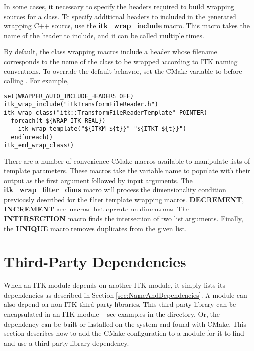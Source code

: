 In some cases, it necessary to specify the headers required to build wrapping
sources for a class. To specify additional headers to included in the generated
wrapping C++ source, use the \textbf{itk\_wrap\_include} macro. This macro takes the
name of the header to include, and it can be called multiple times.

By default, the class wrapping macros include a header whose filename
corresponds to the name of the class to be wrapped according to ITK naming
conventions. To override the default behavior, set the CMake variable
 to  before calling
. For example,

\begin{verbatim}
set(WRAPPER_AUTO_INCLUDE_HEADERS OFF)
itk_wrap_include("itkTransformFileReader.h")
itk_wrap_class("itk::TransformFileReaderTemplate" POINTER)
  foreach(t ${WRAP_ITK_REAL})
    itk_wrap_template("${ITKM_${t}}" "${ITKT_${t}}")
  endforeach()
itk_end_wrap_class()
\end{verbatim}

There are a number of convenience CMake macros available to manipulate lists
of template parameters. These macros take the variable name to populate with
their output as the first argument followed by input arguments. The
\textbf{itk\_wrap\_filter\_dims} macro will process the dimensionality
condition previously described for the filter template wrapping macros.
\textbf{DECREMENT}, \textbf{INCREMENT} are macros that operate on dimensions.
The \textbf{INTERSECTION} macro finds the intersection of two list arguments.
Finally, the \textbf{UNIQUE} macro removes duplicates from the given list.



\section{Third-Party Dependencies}
\label{sec:ThirdParty}

When an ITK module depends on another ITK module, it simply lists its
dependencies as described in Section \ref{sec:NameAndDependencies}. A module
can also depend on non-ITK third-party libraries. This third-party library can
be encapsulated in an ITK module -- see examples in the
 directory. Or, the dependency can be built or
installed on the system and found with CMake. This section describes how to
add the CMake configuration to a module for it to find and use a third-party
library dependency.


